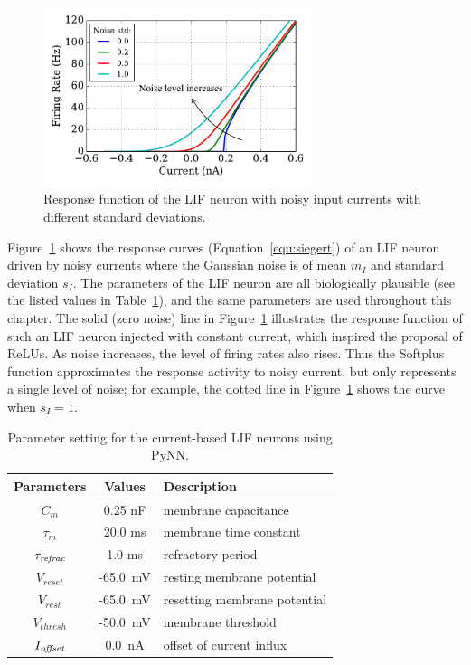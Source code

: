 	
	\begin{figure}[bt]
		\centering
		\includegraphics[width=0.7\textwidth]{pics_iconip/revise_1.pdf}
		\caption[Response function of the LIF neuron.]{Response function of the LIF neuron with noisy input currents with different standard deviations.}
		\label{Fig:physics}
	\end{figure}
	
	Figure~\ref{Fig:physics} shows the response curves (Equation~\ref{equ:siegert}) of an LIF neuron driven by noisy currents where the Gaussian noise is of mean $m_I$ and standard deviation $s_I$.
	The parameters of the LIF neuron are all biologically plausible (see the listed values in Table~\ref{tbl:pynnConfig}), and the same parameters are used throughout this chapter.
	The solid (zero noise) line in Figure~\ref{Fig:physics} illustrates the response function of such an LIF neuron injected with constant current, which inspired the proposal of ReLUs.
	As noise increases, the level of firing rates also rises.
	Thus the Softplus function approximates the response activity to noisy current, but only represents a single level of noise; for example, the dotted line in Figure~\ref{Fig:physics} shows the curve when $s_I=1$.
		\begin{table}[th]
			\centering
			\caption[LIF parameter settings.]{Parameter setting for the current-based LIF neurons using PyNN.}
			\def\arraystretch{1.4}
			\begin{tabular}{c c l}
				Parameters & Values & Description \\
				\hline
				$C_m$ & 0.25 nF & membrane capacitance\\
				$\tau_m$ & 20.0 ms &  membrane time constant\\
				$\tau_{\textit{\textrm{refrac}}}$ & 1.0 ms & refractory period\\
				$V_{reset}$ & -65.0~mV & resting membrane potential\\
				$V_{rest}$ & -65.0~mV & resetting membrane potential\\
				$V_{thresh}$ & -50.0~mV & membrane threshold  \\
				$I_{\textit{\textrm{offset}}}$ & 0.0~nA & offset of current influx  \\
			\end{tabular}
			\label{tbl:pynnConfig}
		\end{table}
		
